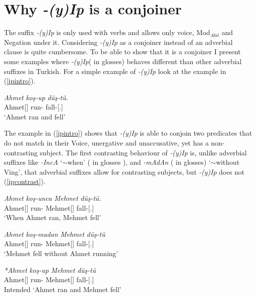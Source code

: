 \section{Why \textit{-(y)Ip} is a conjoiner}

The suffix \textit{-(y)Ip} is only used with verbs and allows only voice, Mod$_{Abil}$ and Negation under it. Considering \textit{-(y)Ip} as a conjoiner instead of an adverbial clause is quite cumbersome. To be able to show that it is a conjoiner I present some examples where \textit{-(y)Ip}({\Pc} in glosses) behaves different than other adverbial suffixes in Turkish. For a simple example of \textit{-(y)Ip} look at the example in (\ref{ipintro}).

\begin{exe}
    \ex \label{ipintro}
    \gll 
    \textit{Ahmet} \textit{koş-up} \textit{düş-tü.} \\ Ahmet[{\Nom}] run-{\Pc} fall-{\Pst}[{\Third}.{\Sg}] \\
    \glt `Ahmet ran and fell'
\end{exe}

The example in (\ref{ipintro}) shows that \textit{-(y)Ip} is able to conjoin two predicates that do not match in their Voice, unergative and unaccusative, yet has a non-contrasting subject. The first contrasting behaviour of \textit{-(y)Ip} is, unlike adverbial suffixes like \textit{-IncA} `$\sim$when' ({\When} in glosses ), and \textit{-mAdAn} ({\Wo} in glosses) `$\sim$without Ving', that adverbial suffixes allow for contrasting subjects, but \textit{-(y)Ip} does not (\ref{ipcontrast}).

\begin{exe}
    \ex \label{ipcontrast}
    \begin{xlist}
        \ex \gll 
        \textit{Ahmet} \textit{koş-unca} \textit{Mehmet} \textit{düş-tü.} \\ Ahmet[{\Nom}] run-{\When} Mehmet[{\Nom}] fall-{\Pst}[{\Third}.{\Sg}] \\
        \glt `When Ahmet ran, Mehmet fell'
        
        \ex \gll 
        \textit{Ahmet} \textit{koş-madan} \textit{Mehmet} \textit{düş-tü} \\ Ahmet[{\Nom}] run-{\Wo} Mehmet[{\Nom}] fall-{\Pst}[{\Third}.{\Sg}] \\
        \glt `Mehmet fell without Ahmet running'
        
        \ex \gll 
        \textit{*Ahmet} \textit{koş-up} \textit{Mehmet} \textit{düş-tü} \\ Ahmet[{\Nom}] run-{\Pc} Mehmet[{\Nom}] fall-{\Pst}[{\Third}.{\Sg}] \\
        \glt Intended `Ahmet ran and Mehmet fell'
        
    \end{xlist}
\end{exe}

